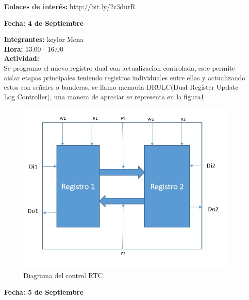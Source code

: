 \documentclass[12pt,a4paper]{report}
\begin{document}
\noindent \textbf{Enlaces de interés:} 
http://bit.ly/2c3durR

\newpage
\begin{flushright}
	\begin{large}
		\textbf{Fecha: 4 de Septiembre}\\[5ex]
	\end{large}
\end{flushright}

\noindent \textbf{Integrantes:} keylor Mena \\[1ex]
\textbf{Hora:} 13:00 - 16:00 \\[1ex]
\textbf{Actividad:} \\[2ex]

Se programo el nuevo registro dual con actualizacion controlada, este permite aislar etapas principales teniendo registros individuales entre ellas y actualizando estos con señales o banderas, se llamo memoria DRULC(Dual Register Update Log Controller), una manera de apreciar se representa en la figura\ref{fig:memoriaDRULC} \\

\begin{figure}[hbtp]
	\centering
	\includegraphics[width=16cm]{Img/memoriaDRULC.jpg}
	\caption{Diagrama del control RTC}
	\label{fig:memoriaDRULC}
\end{figure}


\newpage
\begin{flushright}
	\begin{large}
		\textbf{Fecha: 5 de Septiembre}\\[5ex]
	\end{large}
\end{flushright}
\end{document}
